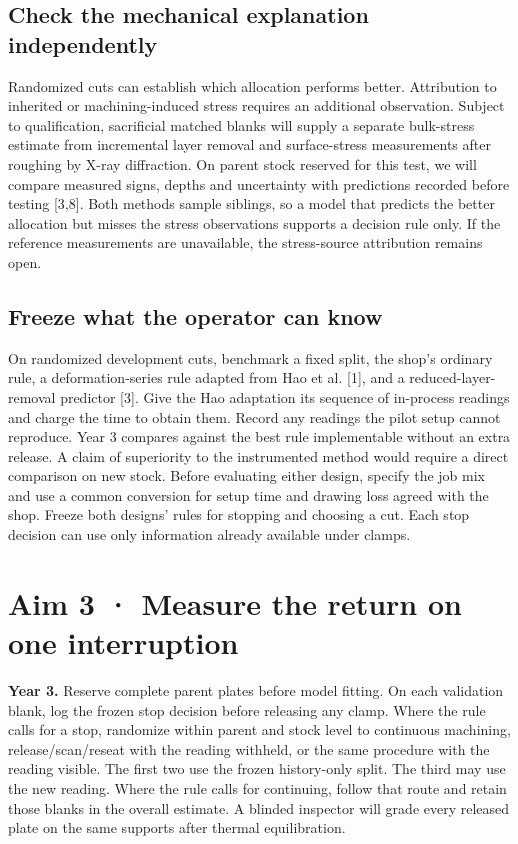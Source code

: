\documentclass[11pt,letterpaper]{article}
\begin{document}
\subsection*{Check the mechanical explanation independently}

Randomized cuts can establish which allocation performs better. Attribution to inherited or machining-induced stress requires an additional observation. Subject to qualification, sacrificial matched blanks will supply a separate bulk-stress estimate from incremental layer removal and surface-stress measurements after roughing by X-ray diffraction. On parent stock reserved for this test, we will compare measured signs, depths and uncertainty with predictions recorded before testing [3,8]. Both methods sample siblings, so a model that predicts the better allocation but misses the stress observations supports a decision rule only. If the reference measurements are unavailable, the stress-source attribution remains open.

\subsection*{Freeze what the operator can know}

On randomized development cuts, benchmark a fixed split, the shop’s ordinary rule, a deformation-series rule adapted from Hao et al. [1], and a reduced-layer-removal predictor [3]. Give the Hao adaptation its sequence of in-process readings and charge the time to obtain them. Record any readings the pilot setup cannot reproduce. Year 3 compares against the best rule implementable without an extra release. A claim of superiority to the instrumented method would require a direct comparison on new stock. Before evaluating either design, specify the job mix and use a common conversion for setup time and drawing loss agreed with the shop. Freeze both designs' rules for stopping and choosing a cut. Each stop decision can use only information already available under clamps.

\newpage

\section*{Aim 3 · Measure the return on one interruption}

\textbf{Year 3.} Reserve complete parent plates before model fitting. On each validation blank, log the frozen stop decision before releasing any clamp. Where the rule calls for a stop, randomize within parent and stock level to continuous machining, release/scan/reseat with the reading withheld, or the same procedure with the reading visible. The first two use the frozen history-only split. The third may use the new reading. Where the rule calls for continuing, follow that route and retain those blanks in the overall estimate. A blinded inspector will grade every released plate on the same supports after thermal equilibration.
\end{document}
